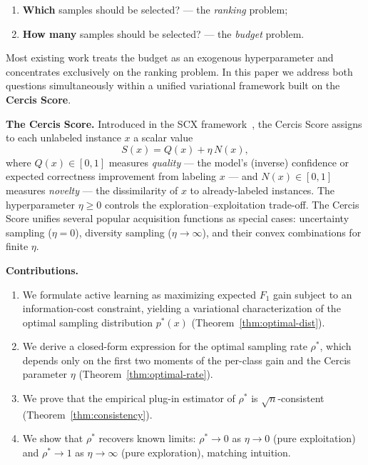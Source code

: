 \documentclass[12pt,a4paper]{article}
\begin{document}
\begin{enumerate}[label=(\roman*)]
    \item \textbf{Which} samples should be selected? — the \emph{ranking}
          problem;
    \item \textbf{How many} samples should be selected? — the \emph{budget}
          problem.
\end{enumerate}

Most existing work treats the budget as an exogenous hyperparameter and
concentrates exclusively on the ranking problem.  In this paper we address
both questions simultaneously within a unified variational framework built on
the \textbf{Cercis Score}.

\medskip\noindent
\textbf{The Cercis Score.}
Introduced in the \textsf{SCX} framework~\citep{scx2024cercis}, the Cercis Score
assigns to each unlabeled instance $x$ a scalar value
\begin{equation}\label{eq:cercis-def}
    S(x) = Q(x) + \eta\,N(x),
\end{equation}
where $Q(x)\in[0,1]$ measures \emph{quality} — the model's (inverse)
confidence or expected correctness improvement from labeling $x$ — and
$N(x)\in[0,1]$ measures \emph{novelty} — the dissimilarity of $x$ to
already-labeled instances.  The hyperparameter $\eta\geq0$ controls the
exploration--exploitation trade-off.  The Cercis Score unifies several
popular acquisition functions as special cases: uncertainty sampling
($\eta=0$), diversity sampling ($\eta\to\infty$), and their convex
combinations for finite $\eta$.

\medskip\noindent
\textbf{Contributions.}
\begin{enumerate}[label=(\arabic*)]
    \item We formulate active learning as maximizing expected $F_1$ gain
          subject to an information-cost constraint, yielding a variational
          characterization of the optimal sampling distribution $p^*(x)$
          (Theorem~\ref{thm:optimal-dist}).
    \item We derive a closed-form expression for the optimal sampling rate
          $\rho^*$, which depends only on the first two moments of the
          per-class gain and the Cercis parameter $\eta$
          (Theorem~\ref{thm:optimal-rate}).
    \item We prove that the empirical plug-in estimator of $\rho^*$ is
          $\sqrt{n}$-consistent (Theorem~\ref{thm:consistency}).
    \item We show that $\rho^*$ recovers known limits: $\rho^*\to0$ as
          $\eta\to0$ (pure exploitation) and $\rho^*\to1$ as
          $\eta\to\infty$ (pure exploration), matching intuition.
\end{enumerate}
\end{document}
